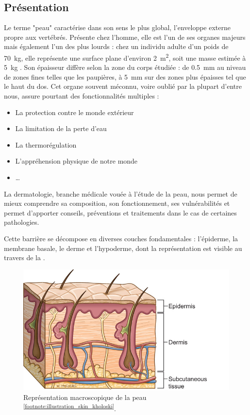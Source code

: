 \subsection{Présentation}
Le terme "peau" caractérise dans son sens le plus global, l’enveloppe externe propre aux vertébrés. Présente chez l’homme, elle est l’un de ses organes majeurs mais également l’un des plus lourds : chez un individu adulte d’un poids de \SI{70}{\kilo\gram}, elle représente une surface plane d’environ \SI{2}{\metre\squared}, soit une masse estimée à \SI{5}{\kilo\gram} \cite{McGrath2010}. Son épaisseur diffère selon la zone du corps étudiée : de \SI{0,5}{\milli\metre} au niveau de zones fines telles que les paupières, à \SI{5}{\milli\metre} sur des zones plus épaisses tel que le haut du dos. Cet organe souvent méconnu, voire oublié par la plupart d’entre nous, assure pourtant des fonctionnalités multiples : 
\begin{itemize}
\item La protection contre le monde extérieur
\item La limitation de la perte d’eau
\item La thermorégulation
\item L’appréhension physique de notre monde
\item \ldots
\end{itemize}\par
La dermatologie, branche médicale vouée à l’étude de la peau, nous permet de mieux comprendre sa composition, son fonctionnement, ses vulnérabilités et permet d’apporter conseils, préventions et traitements dans le cas de certaines pathologies.\par
Cette barrière se décompose en diverses couches fondamentales : l’épiderme, la membrane basale, le derme et l’hypoderme, dont la représentation est visible au travers de la .\par
\begin{figure}[H]
    \centering
    \includegraphics[width=0.6\linewidth]{contents/chapter_1/resources/illustration_skin_kholoski.png}
    \caption{Représentation macroscopique de la peau \textsuperscript{\ref{footnote:illustration_skin_kholoski}}.}
    \label{fig:illustration_skin_kholoski}
\end{figure}
\addtocounter{footnote}{1}
\clearpage

